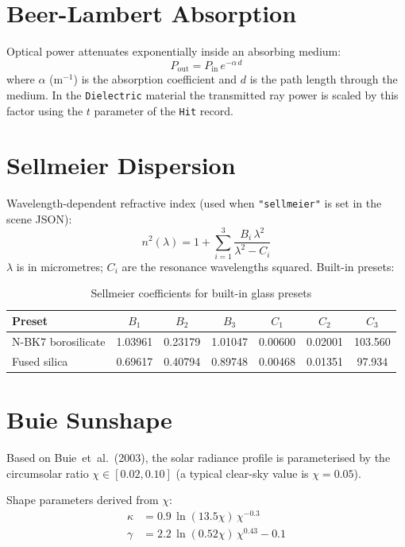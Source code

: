 \documentclass[12pt,a4paper]{report}
\begin{document}
\section{Beer-Lambert Absorption}

Optical power attenuates exponentially inside an absorbing medium:
\begin{equation}
  P_{\text{out}} = P_{\text{in}}\, e^{-\alpha\, d}
\end{equation}
where $\alpha$ (m$^{-1}$) is the absorption coefficient and $d$ is the path length through
the medium.  In the \texttt{Dielectric} material the transmitted ray power is scaled by this
factor using the $t$ parameter of the \texttt{Hit} record.

\section{Sellmeier Dispersion}

Wavelength-dependent refractive index (used when \texttt{"sellmeier"} is set in the scene
JSON):
\begin{equation}
  n^2(\lambda) = 1 + \sum_{i=1}^{3} \frac{B_i\,\lambda^2}{\lambda^2 - C_i}
\end{equation}
$\lambda$ is in micrometres; $C_i$ are the resonance wavelengths squared.  Built-in presets:

\begin{table}[H]\centering
\caption{Sellmeier coefficients for built-in glass presets}
\begin{tabular}{lcccccc}
\toprule
Preset & $B_1$ & $B_2$ & $B_3$ & $C_1$ & $C_2$ & $C_3$ \\
\midrule
N-BK7 borosilicate & 1.03961 & 0.23179 & 1.01047 & 0.00600 & 0.02001 & 103.560 \\
Fused silica        & 0.69617 & 0.40794 & 0.89748 & 0.00468 & 0.01351 & 97.934  \\
\bottomrule
\end{tabular}
\end{table}

\section{Buie Sunshape}

Based on Buie~et~al.\ (2003), the solar radiance profile is parameterised by the
circumsolar ratio $\chi \in [0.02, 0.10]$ (a typical clear-sky value is $\chi = 0.05$).

Shape parameters derived from $\chi$:
\begin{align}
  \kappa &= 0.9\,\ln(13.5\chi)\,\chi^{-0.3} \\
  \gamma &= 2.2\,\ln(0.52\chi)\,\chi^{0.43} - 0.1
\end{align}
\end{document}
